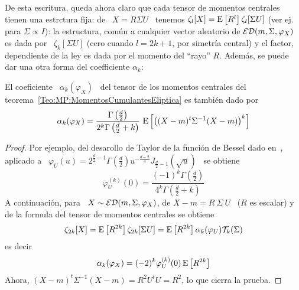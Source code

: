 De  esta escritura,  queda ahora  claro que  cada tensor  de  momentos centrales
tienen  una estrctura  fija: de  \ $X  =  R \Sigma  U$ \  tenemos $\zeta_l[X]  =
\operatorname{E}\left[  R^l \right]  \zeta_l[\Sigma  U]$ (ver  ej.~\cite[teo.~2.8]{FanKot90}
para $\Sigma \propto I$): la estructura, com\'un a cualquier vector aleatorio de
$\mathcal{ED}(m,\Sigma,\varphi_X)$ es dada por \  $\zeta_k[\Sigma U]$ (cero cuando $l = 2
k + 1$, por  simetr\'ia central) y el factor, dependiente de  la ley es dada por
el  momento  del  ``rayo'' $R$.  Adem\'as,  se  puede  dar  una otra  forma  del
coefficiente $\alpha_k$:
%
\begin{lema}\label{Lem:MP:AlphaConR}
  El coeficiente \ $\alpha_k(\varphi_X)$ \  del tensor de los momentos centrales
  del teorema~\ref{Teo:MP:MomentosCumulantesEliptica} es tambi\'en dado por
  \[
  \alpha_k(\varphi_X) = \frac{\Gamma\left( \frac{d}{2} \right)}{2^k \Gamma\left(
      \frac{d}{2}  + k\right)}  \, \operatorname{E}\left[  \left( (X-m)^t  \Sigma^{-1} (X-m)
    \right)^k \right]
  \]
\end{lema}
%
\begin{proof}
  Por  ejemplo,  del  desarollo  de  Taylor  de  la  funci\'on  de  Bessel  dado
  en~\cite{GraRyz15},   aplicado   a   \   $\varphi_U(u)   =   2^{\frac{d}{2}-1}
  \Gamma\left(  \frac{d}{2} \right) u^{-\frac{d-2}{4}}  J_{\frac{d}{2}-1} \left(
    \sqrt{u} \right)$ \ se obtiene
  \[
  \varphi_U^{(k)}(0)   =  \frac{(-1)^k   \Gamma\left(   \frac{d}{2}  \right)}{4^k
  \Gamma\left( \frac{d}{2} + k\right)}
  \]
  A  continuaci\'on, para  \ $X  \sim \mathcal{ED}(m,\Sigma,\varphi_X)$,  de $X-m  =  R \
  \Sigma  \ U$  \  ($R$ es  escalar)  y de  la formula  del  tensor de  momentos
  centrales se obtiene
  \[
  \zeta_{2    k}[X]     =    \operatorname{E}\left[    R^{2     k}    \right]
  \zeta_{2   k}[\Sigma   U]   =   \operatorname{E}\left[  R^{2   k}   \right]
  \alpha_k(\varphi_U) \mathcal{T}_k(\Sigma)
  \]
  es decir
  \[
  \alpha_k(\varphi_X) = (-2)^k \varphi_U^{(k)}(0) \operatorname{E}\left[ R^{2 k} \right]
  \]
  Ahora, $(X-m)^t \Sigma^{-1} (X-m) = R^2 U^t U = R^2$, lo que cierra la prueba.
\end{proof}

